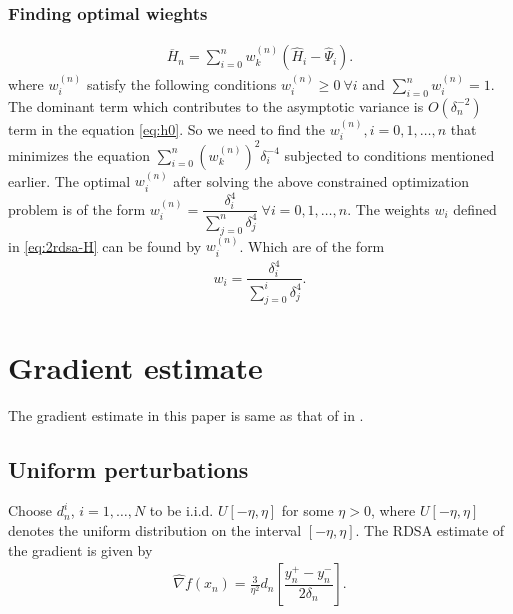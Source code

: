 \documentclass[letterpaper, 10 pt, conference]{ieeeconf}  %
\begin{document}
\subsubsection{Finding optimal wieghts}
\begin{align}
\label{eq:hess}
\overline H_n = \sum\limits_{i=0}^{n} w_k^{(n)}(\widehat H_i -\widehat \Psi_i).
\end{align}
where $w_i^{(n)}$ satisfy the following conditions $w_i^{(n)} \geq 0 ~\forall i$ and $\sum \limits_{i=0}^{n}w_i^{(n)} = 1$. The dominant term which contributes to the asymptotic variance is $O(\delta_n^{-2})$ term in the equation \eqref{eq:h0}. So we need to find the $w_i^{(n)},i=0,1,\ldots,n$ that minimizes the equation $\sum \limits_{i=0}^{n} (w_k^{(n)})^2 \delta_i^{-4}$ subjected to conditions mentioned earlier. The optimal $w_i^{(n)}$ after solving the above constrained optimization problem is of the form $w_i^{(n)} = \dfrac{\delta_i^{4}}{\sum \limits_{j=0}^{n} \delta_j^{4}} ~\forall i=0,1,\ldots,n$. The weights $w_i$ defined in \eqref{eq:2rdsa-H}
can be found by $w_i^{(n)}$. Which are of the form 
\begin{align}
\label{eq:wieghts}
w_i  = \dfrac{\delta_i^{4}}{\sum\limits_{j=0}^{i} \delta_j^{4} } .
\end{align}

\section{Gradient estimate}\label{sec:grad}
The gradient estimate in this paper is same as that of in \cite{prashanth2015rdsa}.
\subsection*{\textbf{Uniform perturbations}}
Choose $d_n^i$, $ i=1,\ldots,N$ to be i.i.d. $U[-\eta,\eta]$ for some $\eta>0$, where $U[-\eta,\eta]$ denotes the uniform distribution on the interval $[-\eta,\eta]$.
The RDSA estimate of the gradient is given by
\begin{align}
\label{eq:grad-unif}
\widehat\nabla f(x_n) = \frac3{\eta^2} d_n \left[ \dfrac{y_n^+ - y_n^-}{2\delta_n}\right].
\end{align}
\end{document}
